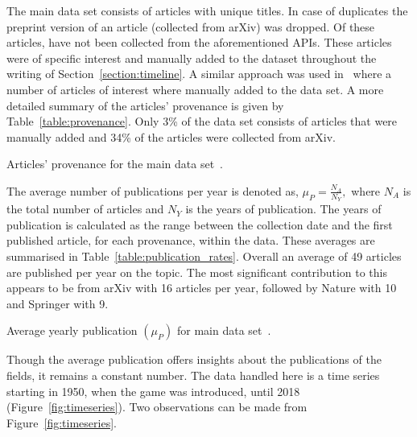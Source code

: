 \documentclass{article}
\theoremstyle{definition}
\newcommand{\totalarticles}{}
\newcommand{\manual}{}
\begin{document}
The main data set
consists of \totalarticles articles with unique titles. In case of duplicates
the preprint version of an article (collected from arXiv) was dropped.
Of these \totalarticles articles, \manual have not been collected from the
aforementioned APIs. These articles were of specific interest and manually added
to the dataset throughout the writing of Section~\ref{section:timeline}. A
similar approach was used in~\cite{Liu2015} where a number of articles of interest
where manually added to the data set. A more
detailed summary of the articles' provenance is given by Table~\ref{table:provenance}.
Only 3\% of the data set consists of articles that were manually added and 34\% of the
articles were collected from arXiv.

\begin{table}[!hbtp]
    \begin{center}
    
    \end{center}
    \caption{Articles' provenance for the main data set~\cite{pd_data_2018}.}
    \label{table:provenance}
\end{table}

The average number of publications per year is denoted as, \(\mu_P =
\frac{N_A}{N_Y},\) where \(N_A\) is the total number of articles and \(N_Y\) is
the years of publication. The years of publication is calculated as the range
between the collection date and the first published article, for each
provenance, within the data. These averages are summarised in
Table~\ref{table:publication_rates}. Overall an average of 49 articles are
published per year on the topic. The most significant contribution to this
appears to be from arXiv with 16 articles per year, followed by Nature with 10
and Springer with 9.

\begin{table}[!hbtp]
    \begin{center}
    
    \end{center}
    \caption{Average yearly publication $(\mu_P)$ for main data set~\cite{pd_data_2018}.}
    \label{table:publication_rates}
\end{table}

Though the average publication offers insights about the publications of the
fields, it remains a constant number. The data handled here is a time
series starting in 1950, when the game was introduced, until 2018 (Figure~\ref{fig:timeseries}). 
Two observations can be made from Figure~\ref{fig:timeseries}.
\end{document}
